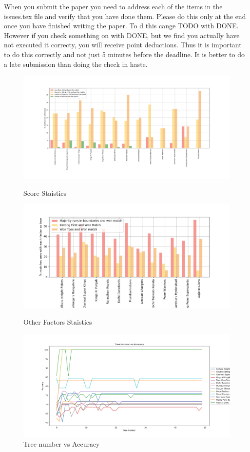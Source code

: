 \documentclass[sigconf]{acmart}
\begin{document}
When you submit the paper you need to address each of the items in the
issues.tex file and verify that you have done them. Please do this
only at the end once you have finished writing the paper. To d this
cange TODO with DONE. However if you check something on with DONE, but
we find you actually have not executed it correcty, you will receive
point deductions. Thus it is important to do this correctly and not
just 5 minutes before the deadline. It is better to do a late
submission than doing the check in haste. 
\begin{figure}[!ht]
  \centering\includegraphics[width=\columnwidth]{images/scorestatictics.png}
  \caption{Score Staistics}\label{f:scorestats}
  
   \centering\includegraphics[width=\columnwidth]{images/otherstatistics.png}
  \caption{Other Factors Staistics}\label{f:otherstats}
  
  \centering\includegraphics[width=\columnwidth]{images/treenumvsaccuracy.png}
  \caption{Tree number vs Accuracy}\label{f:treenumvsaccuracy}
  

\end{figure}
\end{document}
